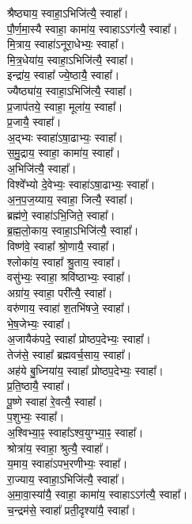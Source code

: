 श्रैष्ठ्याय॒ स्वाहा॒ऽभिजि॑त्यै॒ स्वाहा᳚।\\
पौ॒र्ण॒मा॒स्यै स्वाहा॒ कामा॑य॒ स्वाहाऽऽग॑त्यै॒ स्वाहा᳚।\\
मि॒त्राय॒ स्वाहा॑ऽनूरा॒धेभ्यः॒ स्वाहा᳚।\\
मि॒त्र॒धेया॑य॒ स्वाहा॒ऽभिजि॑त्यै॒ स्वाहा᳚।\\
इन्द्रा॑य॒ स्वाहा᳚ ज्ये॒ष्ठायै॒ स्वाहा᳚।\\
ज्यैष्ठ्या॑य॒ स्वाहा॒ऽभिजि॑त्यै॒ स्वाहा᳚।\\
प्र॒जाप॑तये॒ स्वाहा॒ मूला॑य॒ स्वाहा᳚।\\
प्र॒जायै॒ स्वाहा᳚।\\
अ॒द्भ्यः स्वाहा॑ऽषा॒ढाभ्यः॒ स्वाहा᳚।\\
स॒मु॒द्राय॒ स्वाहा॒ कामा॑य॒ स्वाहा᳚।\\
अ॒भिजि॑त्यै॒ स्वाहा᳚।\\
विश्वे᳚भ्यो दे॒वेभ्यः॒ स्वाहा॑ऽषा॒ढाभ्यः॒ स्वाहा᳚।\\
अ॒न॒प॒ज॒य्याय॒ स्वाहा॒ जित्यै॒ स्वाहा᳚।\\
ब्रह्म॑णे॒ स्वाहा॑ऽभि॒जिते॒ स्वाहा᳚।\\
ब्र॒ह्म॒लो॒काय॒ स्वाहा॒ऽभिजि॑त्यै॒ स्वाहा᳚।\\
विष्ण॑वे॒ स्वाहा᳚ श्रो॒णायै॒ स्वाहा᳚।\\
श्लोका॑य॒ स्वाहा᳚ श्रु॒ताय॒ स्वाहा᳚।\\
वसु॑भ्यः॒ स्वाहा॒ श्रवि॑ष्ठाभ्यः॒ स्वाहा᳚।\\
अग्रा॑य॒ स्वाहा॒ परी᳚त्यै॒ स्वाहा᳚।\\
वरु॑णाय॒ स्वाहा॑ श॒तभि॑षजे॒ स्वाहा᳚।\\
भे॒ष॒जेभ्यः॒ स्वाहा᳚।\\
अ॒जायैक॑पदे॒ स्वाहा᳚ प्रोष्ठप॒देभ्यः॒ स्वाहा᳚।\\
तेज॑से॒ स्वाहा᳚ ब्रह्मवर्च॒साय॒ स्वाहा᳚।\\
अह॑ये बु॒ध्निया॑य॒ स्वाहा᳚ प्रोष्ठप॒देभ्यः॒ स्वाहा᳚।\\
प्र॒ति॒ष्ठायै॒ स्वाहा᳚।\\
पू॒ष्णे स्वाहा॑ रे॒वत्यै॒ स्वाहा᳚।\\
प॒शुभ्यः॒ स्वाहा᳚।\\
अ॒श्विभ्या॒ꣴ॒ स्वाहा᳚ऽश्व॒युग्भ्या॒ꣴ॒ स्वाहा᳚।\\
श्रोत्रा॑य॒ स्वाहा॒ श्रुत्यै॒ स्वाहा᳚।\\
य॒माय॒ स्वाहा॑ऽपभ॒रणीभ्यः॒ स्वाहा᳚।\\
रा॒ज्याय॒ स्वाहा॒ऽभिजि॑त्यै॒ स्वाहा᳚।\\
अ॒मा॒वा॒स्या॑यै॒ स्वाहा॒ कामा॑य॒ स्वाहाऽऽग॑त्यै॒ स्वाहा᳚।\\
च॒न्द्रम॑से॒ स्वाहा᳚ प्रती॒दृश्या॑यै॒ स्वाहा᳚।\\
